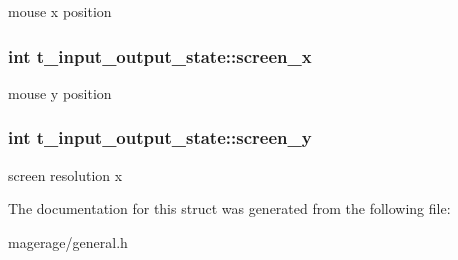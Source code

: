 mouse x position \hypertarget{structt__input__output__state_af03e61a9a04ba5fe1a572ec3ce654e47}{
\subsubsection[{screen\-\_\-x}]{\setlength{\rightskip}{0pt plus 5cm}int t\-\_\-input\-\_\-output\-\_\-state\-::screen\-\_\-x}}\label{structt__input__output__state_af03e61a9a04ba5fe1a572ec3ce654e47}
mouse y position \hypertarget{structt__input__output__state_ab04e56c5d58491073a68614686e2fc53}{
\subsubsection[{screen\-\_\-y}]{\setlength{\rightskip}{0pt plus 5cm}int t\-\_\-input\-\_\-output\-\_\-state\-::screen\-\_\-y}}\label{structt__input__output__state_ab04e56c5d58491073a68614686e2fc53}
screen resolution x 

The documentation for this struct was generated from the following file\-:\begin{DoxyCompactItemize}
\item 
magerage/general.\-h\end{DoxyCompactItemize}
